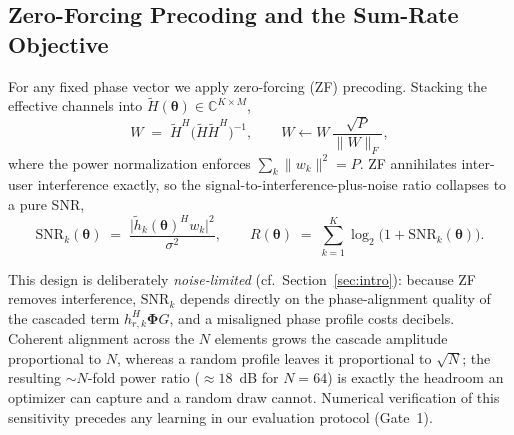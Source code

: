 \subsection{Zero-Forcing Precoding and the Sum-Rate Objective}
For any fixed phase vector we apply zero-forcing (ZF) precoding. Stacking the
effective channels into $\tilde{H}(\boldsymbol{\theta}) \in \mathbb{C}^{K
\times M}$,
\begin{equation}
W \;=\; \tilde{H}^{H}\bigl(\tilde{H}\tilde{H}^{H}\bigr)^{-1},
\qquad
W \leftarrow W \,\frac{\sqrt{P}}{\|W\|_F},
\label{eq:zf}
\end{equation}
where the power normalization enforces $\sum_k \|w_k\|^2 = P$. ZF annihilates
inter-user interference exactly, so the signal-to-interference-plus-noise
ratio collapses to a pure SNR,
\begin{equation}
\mathrm{SNR}_k(\boldsymbol{\theta}) \;=\;
\frac{\bigl|\tilde{h}_k(\boldsymbol{\theta})^{H} w_k\bigr|^2}{\sigma^2},
\qquad
R(\boldsymbol{\theta}) \;=\; \sum_{k=1}^{K} \log_2\!\bigl(1 + \mathrm{SNR}_k(\boldsymbol{\theta})\bigr).
\label{eq:sum_rate}
\end{equation}

This design is deliberately \emph{noise-limited} (cf.\ Section~\ref{sec:intro}):
because ZF removes interference, $\mathrm{SNR}_k$ depends directly on the
phase-alignment quality of the cascaded term $h_{r,k}^{H}\boldsymbol{\Phi} G$,
and a misaligned phase profile costs decibels. Coherent alignment across the
$N$ elements grows the cascade amplitude proportional to $N$, whereas a random
profile leaves it proportional to $\sqrt{N}$; the resulting $\sim\!N$-fold
power ratio ($\approx 18$~dB for $N = 64$) is exactly the headroom an
optimizer can capture and a random draw cannot. Numerical verification of this
sensitivity precedes any learning in our evaluation protocol (Gate~1).

